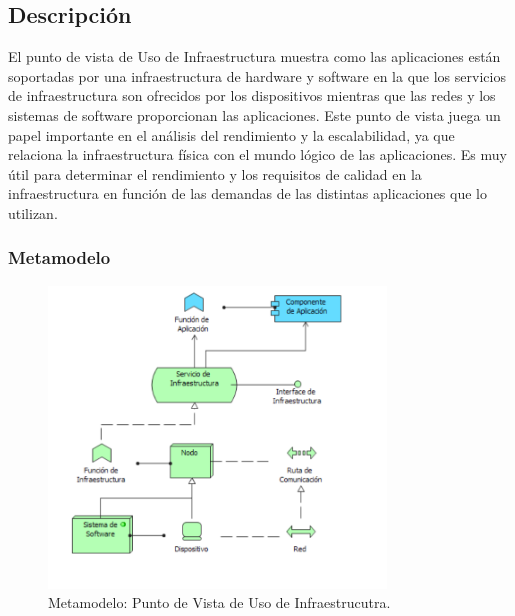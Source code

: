 \subsection{Descripción}
El punto de vista de Uso de Infraestructura muestra como las aplicaciones están soportadas por una infraestructura de hardware y software en la que los servicios de infraestructura  son ofrecidos por los dispositivos mientras que las  redes y los sistemas de software proporcionan las aplicaciones. Este punto de vista juega un papel importante en el análisis del rendimiento y la escalabilidad, ya que relaciona la infraestructura física con el mundo lógico de las aplicaciones. Es muy útil para determinar el rendimiento y los requisitos de calidad en la infraestructura en función de las demandas de las distintas aplicaciones que lo utilizan.

\subsubsection{Metamodelo}
\begin{figure}[h]
	\centering
	\includegraphics[width=0.8\textwidth]{imagenes/Metamodelos/Tecnologia/meta_uso_infraestructura.PDF}
	\caption{Metamodelo: Punto de Vista de Uso de Infraestrucutra.}
	\label{fig:gap_analysis}
\end{figure}


